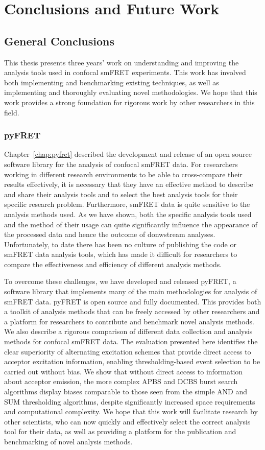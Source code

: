 \chapter{Conclusions and Future Work}
\label{chap:conclusions}

\section{General Conclusions}
This thesis presents three years' work on understanding and improving the analysis tools used in confocal smFRET experiments. This work has involved both implementing and benchmarking existing techniques, as well as implementing and thoroughly evaluating novel methodologies. We hope that this work provides a strong foundation for rigorous work by other researchers in this field.

\subsection{pyFRET}
Chapter~\ref{chap:pyfret} described the development and release of an open source software library for the analysis of confocal smFRET data. For researchers working in different research environments to be able to cross-compare their results effectively, it is necessary that they have an effective method to describe and share their analysis tools and to select the best analysis tools for their specific research problem. Furthermore, smFRET data is quite sensitive to the analysis methods used.  As we have shown, both the specific analysis tools used and the method of their usage can quite significantly influence the appearance of the processed data and hence the outcome of donwstream analyses. Unfortunately, to date there has been no culture of publishing the code or smFRET data analysis tools, which has made it difficult for researchers to compare the effectiveness and efficiency of different analysis methods.

To overcome these challenges, we have developed and released pyFRET, a software library that implements many of the main methodologies for analysis of smFRET data. pyFRET is open source and fully documented. This provides both a toolkit of analysis methods that can be freely accessed by other researchers and a platform for researchers to contribute and benchmark novel analysis methods. We also describe a rigorous comparison of different data collection and analysis methods for confocal smFRET data. The evaluation presented here identifies the clear superiority of alternating excitation schemes that provide direct access to acceptor excitation information, enabling thresholding-based event selection to be carried out without bias. We show that without direct access to information about acceptor emission, the more complex APBS and DCBS burst search algorithms display biases comparable to those seen from the simple AND and SUM thresholding algorithms, despite significantly increased space requirements and computational complexity. We hope that this work will facilitate research by other scientists, who can now quickly and effectively select the correct analysis tool for their data, as well as providing a platform for the publication and benchmarking of novel analysis methods.

